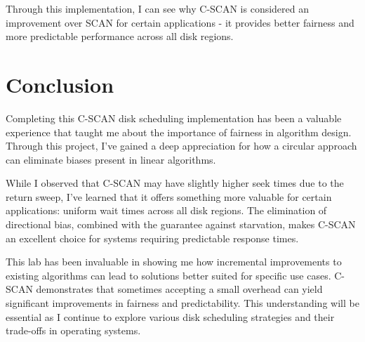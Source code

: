 \documentclass[12pt,a4paper]{article}
\begin{document}
Through this implementation, I can see why C-SCAN is considered an improvement over SCAN for certain applications - it provides better fairness and more predictable performance across all disk regions.

\section{Conclusion}
Completing this C-SCAN disk scheduling implementation has been a valuable experience that taught me about the importance of fairness in algorithm design. Through this project, I've gained a deep appreciation for how a circular approach can eliminate biases present in linear algorithms.

While I observed that C-SCAN may have slightly higher seek times due to the return sweep, I've learned that it offers something more valuable for certain applications: uniform wait times across all disk regions. The elimination of directional bias, combined with the guarantee against starvation, makes C-SCAN an excellent choice for systems requiring predictable response times.

This lab has been invaluable in showing me how incremental improvements to existing algorithms can lead to solutions better suited for specific use cases. C-SCAN demonstrates that sometimes accepting a small overhead can yield significant improvements in fairness and predictability. This understanding will be essential as I continue to explore various disk scheduling strategies and their trade-offs in operating systems.
\end{document}
